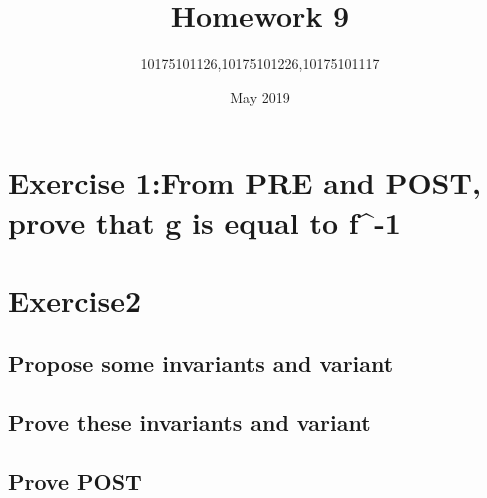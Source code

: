 \documentclass[11pt,a4paper,fleqn]{article}
\title{Homework 9}
\author{10175101126,10175101226,10175101117}
\date{May 2019}
\begin{document}
\maketitle


\section{Exercise 1:From PRE and POST, prove that g is equal to  f^-1}
\noindent





\section{Exercise2 }

\subsection{Propose some invariants and variant}

\subsection{ Prove these invariants and variant}

\subsection{Prove POST}



%
%
\end{document}
